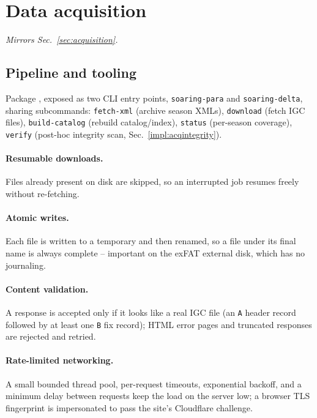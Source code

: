\section{Data acquisition}
\label{impl:acquisition}
\emph{Mirrors Sec.~\ref{sec:acquisition}.}

\subsection{Pipeline and tooling}
\label{impl:acqpipeline}
Package , exposed as two CLI entry points,
\texttt{soaring-para} and \texttt{soaring-delta}, sharing subcommands: \texttt{fetch-xml}
(archive season XMLs), \texttt{download} (fetch IGC files), \texttt{build-catalog}
(rebuild catalog/index), \texttt{status} (per-season coverage), \texttt{verify}
(post-hoc integrity scan, Sec.~\ref{impl:acqintegrity}). 

\paragraph{Resumable downloads.} Files already present on disk are skipped, so an
interrupted job resumes freely without re-fetching.

\paragraph{Atomic writes.} Each file is written to a temporary  and then
renamed, so a file under its final name is always complete -- important on the exFAT
external disk, which has no journaling.

\paragraph{Content validation.} A response is accepted only if it looks like a real IGC
file (an \texttt{A} header record followed by at least one \texttt{B} fix record); HTML
error pages and truncated responses are rejected and retried.

\paragraph{Rate-limited networking.} A small bounded thread pool, per-request timeouts,
exponential backoff, and a minimum delay between requests keep the load on the server
low; a browser TLS fingerprint is impersonated to pass the site's Cloudflare challenge.

